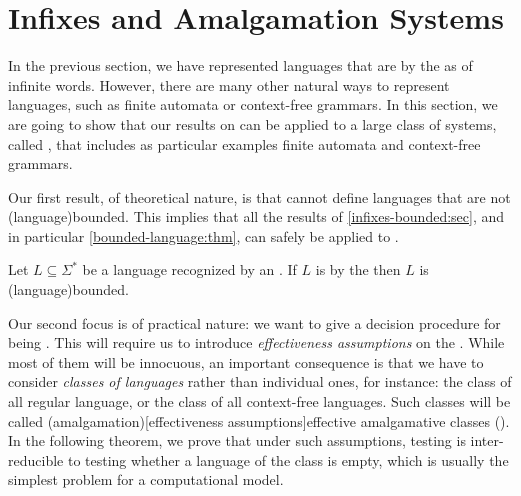 \section{Infixes and Amalgamation Systems}
\label{infixes-amalgamation:sec}

\AP In the previous section, we have represented languages that are
 by the  as  of infinite
words. However, there are many other natural ways to represent languages, such
as finite automata or context-free grammars. In this section, we are going to
show that our results on  can be applied to a large class
of systems, called , that includes as particular
examples finite automata and context-free grammars. 

\AP Our first result, of theoretical nature, is that 
cannot define  languages that are not
\kl(language){bounded}. This implies that all the results of
\cref{infixes-bounded:sec}, and in particular \cref{bounded-language:thm}, can
safely be applied to .

\begin{theorem}
    \label{infix-amalgamation:thm}
    Let $L \subseteq \Sigma^*$ be a language recognized by an 
    .
    If $L$ is  by the  then $L$ is
    \kl(language){bounded}.
\end{theorem}

\AP Our second focus is of practical nature: we want to give a decision
procedure for being . This will require us to introduce
\emph{effectiveness assumptions} on the . While most
of them will be innocuous, an important consequence is that we have to consider
\emph{classes of languages} rather than individual ones, for instance: the
class of all regular language, or the class of all context-free languages. Such
classes will be called \kl(amalgamation)[effectiveness assumptions]{effective
amalgamative classes} (). In the
following theorem, we prove that under such assumptions, testing
 is inter-reducible to testing whether a language of
the class is empty, which is usually the simplest problem for a computational
model.

